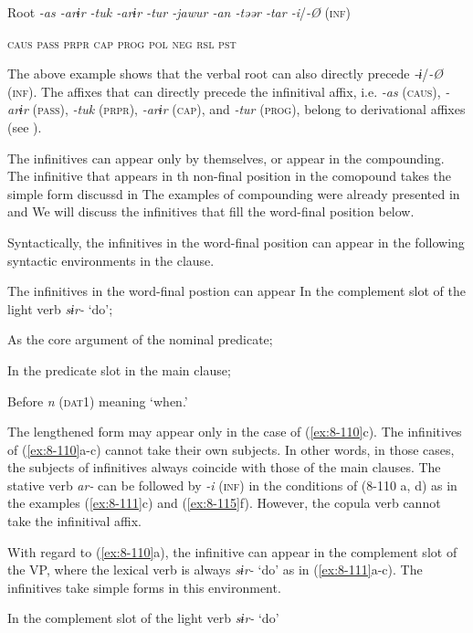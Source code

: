   Root  \textit{-as  -arɨr  -tuk  -arɨr  -tur  -jawur  -an  -təər  -tar  -i}/\textit{-Ø} (\textsc{inf})

    \textsc{caus}  \textsc{pass}  \textsc{prpr}  \textsc{cap}  \textsc{prog}  \textsc{pol}  \textsc{neg}  \textsc{rsl}  \textsc{pst}
\z

The above example shows that the verbal root can also directly precede \textit{-ɨ}/\textit{-Ø} (\textsc{inf}). The affixes that can directly precede the infinitival affix, i.e. \textit{-as} (\textsc{caus}), \textit{-arɨr} (\textsc{pass}), \textit{-tuk} (\textsc{prpr}), \textit{-arɨr} (\textsc{cap}), and \textit{-tur} (\textsc{prog}), belong to derivational affixes (see ).

  The infinitives can appear only by themselves, or appear in the compounding. The infinitive that appears in th non-final position in the comopound takes the simple form discussd in  The examples of compounding were already presented in  and  We will discuss the infinitives that fill the word-final position below.

  Syntactically, the infinitives in the word-final position can appear in the following syntactic environments in the clause.

\ea\label{ex:8-110}
  The infinitives in the word-final postion can appear
\ea In the complement slot of the light verb \textit{sɨr-} ‘do’;

\ex As the core argument of the nominal predicate;

\ex In the predicate slot in the main clause;

\ex Before \textit{n} (\textsc{dat1}) meaning ‘when.’
\z
\z

The lengthened form may appear only in the case of (\ref{ex:8-110}c). The infinitives of (\ref{ex:8-110}a-c) cannot take their own subjects. In other words, in those cases, the subjects of infinitives always coincide with those of the main clauses. The stative verb \textit{ar-} can be followed by \textit{-i} (\textsc{inf}) in the conditions of (8-110 a, d) as in the examples (\ref{ex:8-111}c) and (\ref{ex:8-115}f). However, the copula verb cannot take the infinitival affix.

With regard to (\ref{ex:8-110}a), the infinitive can appear in the complement slot of the VP, where the lexical verb is always \textit{sɨr-} ‘do’ as in (\ref{ex:8-111}a-c). The infinitives take simple forms in this environment.

\ea\label{ex:8-111}
  In the complement slot of the light verb \textit{sɨr-} ‘do’

